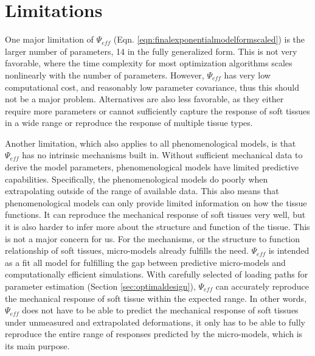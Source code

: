 

\section{Limitations} 
	
    One major limitation of $\Psi_{eff}$ (Eqn. \ref{eqn:finalexponentialmodelformscaled}) is the larger number of parameters, 14 in the fully generalized form. This is not very favorable, where the time complexity for most optimization algorithms scales nonlinearly with the number of parameters. However, $\Psi_{eff}$ has very low computational cost, and reasonably low parameter covariance, thus this should not be a major problem. Alternatives are also less favorable, as they either require more parameters or cannot sufficiently capture the response of soft tissues in a wide range or reproduce the response of multiple tissue types. 
    
    Another limitation, which also applies to all phenomenological models, is that $\Psi_{eff}$ has no intrinsic mechanisms built in. Without sufficient mechanical data to derive the model parameters, phenomenological models have limited predictive capabilities. Specifically, the phenomenological models do poorly when extrapolating outside of the range of available data. This also means that phenomenological models can only provide limited information on how the tissue functions. It can reproduce the mechanical response of soft tissues very well, but it is also harder to infer more about the structure and function of the tissue. This is not a major concern for us. For the mechanisms, or the structure to function relationship of soft tissues, micro-models already fulfills the need. $\Psi_{eff}$ is intended as a fit all model for fulfilling the gap between predictive micro-models and computationally efficient simulations. With carefully selected of loading paths for parameter estimation (Section \ref{sec:optimaldesign}), $\Psi_{eff}$ can accurately reproduce the mechanical response of soft tissue within the expected range. In other words, $\Psi_{eff}$ does not have to be able to predict the mechanical response of soft tissues under unmeasured and extrapolated deformations, it only has to be able to fully reproduce the entire range of responses predicted by the micro-models, which is its main purpose. 




